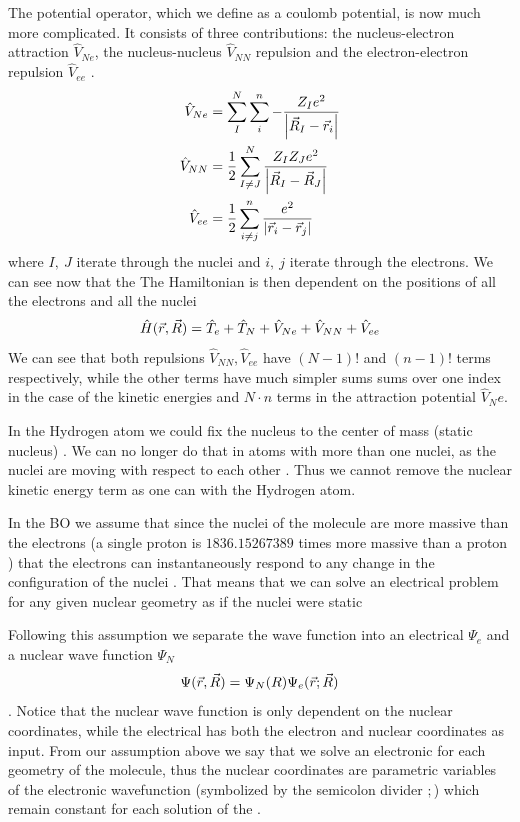 \documentclass[../master_thesis.tex]{subfiles}
\begin{document}
The potential operator, which we define as a coulomb potential, is now much more
complicated. It consists of three contributions: the nucleus-electron attraction
$\hat{V}_{Ne}$, the nucleus-nucleus $\hat{V}_{NN}$ repulsion and the electron-electron
repulsion $\hat{V}_{ee}$ \cite{Cramer:2004}.
\begin{align}
  \hat{V}_{Ne} &= \sum^N_I\sum^n_{i}-\frac{Z_Ie^2}{\abs{\vec{R}_I - \vec{r}_i}}\\
  \hat{V}_{NN} &= \frac{1}{2}\sum^N_{I \neq J}\frac{Z_IZ_Je^2}{\abs{\vec{R}_I - \vec{R}_J}}\\
  \hat{V}_{ee} &= \frac{1}{2}\sum^n_{i \neq j} \frac{e^2}{\abs{\vec{r}_i - \vec{r}_j}}
\end{align}
where $I,\ J$ iterate through the nuclei and $i, \ j$ iterate through the electrons.
We can see now that the
The Hamiltonian is then dependent on the positions of all the electrons and all
the nuclei \cite{Jensen:2017}
\begin{equation}
  \hat{H}(\vec{r}, \vec{R}) = \hat{T}_e + \hat{T}_N + \hat{V}_{Ne} +\hat{V}_{NN} + \hat{V}_{ee}
\end{equation}
We can see that both repulsions $\hat{V}_{NN}, \hat{V}_{ee}$ have $(N - 1)!$ and $(n - 1)!$ terms
 respectively, while the other terms have much simpler sums {sums over one index in the case of the
kinetic energies and $N\cdot n$ terms in the attraction potential $\hat{V}_Ne$}.

In the Hydrogen atom we could fix the nucleus to the center of mass (static nucleus)
\cite{Jensen:2017}. We can no longer do that in atoms with more than one nuclei, as
the nuclei are moving with respect to each other \cite{Cramer:2004}. Thus we cannot
remove the nuclear kinetic energy term as one can with the Hydrogen atom.

In the \ac{BO}  we assume that since the nuclei of the molecule are more massive
than the electrons (a single proton is $1836.152 673 89$ times more massive
than a proton \cite{NIST:2019}) that the electrons can instantaneously respond to
any change in the configuration of the nuclei \cite{Atkins:2011}. That means that we can solve an
electrical problem for any given nuclear geometry as if the nuclei were static
\cite{Cramer:2004, Jensen:2017, Atkins:2014}

Following this  assumption we separate the wave function into an electrical
$\Psi_e$ and a nuclear wave function $\Psi_N$
\begin{equation}
  \Psi(\vec{r}, \vec{R}) = \Psi_N(R)\Psi_e(\vec{r}; \vec{R})
\end{equation}.
Notice that the nuclear wave function is only dependent on the nuclear coordinates,
while the electrical has both the electron and nuclear coordinates as input. From
our assumption above we say that we solve an electronic \SE for each geometry
of the molecule, thus the nuclear coordinates  are parametric variables of
the electronic wavefunction (symbolized by the semicolon divider $;$) which remain
constant for each solution of the \SE.
\end{document}

